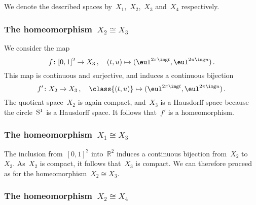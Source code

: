 \subsection{}

We denote the described spaces by~$X_1$,~$X_2$,~$X_3$ and~$X_4$ respectively.



\subsubsection*{The homeomorphism~$X_2 ≅ X_3$}

We consider the map
\[
	f
	\colon
	[0, 1]^2 \to X_3 \,,
	\quad
	(t, u) \mapsto (\eul^{2 \pi \img t}, \eul^{2 \pi \img u}) \,.
\]
This map is continuous and surjective, and induces a continuous bijection
\[
	f'
	\colon
	X_2 \to X_3 \,,
	\quad
	\class{(t, u)} \mapsto (\eul^{2 \pi \img t}, \eul^{2 \pi \img u}) \,.
\]
The quotient space~$X_2$ is again compact, and~$X_3$ is a Hausdorff space because the circle~$\mathrm{S}^1$ is a Hausdorff space.
It follows that~$f'$ is a homeomorphism.



\subsubsection*{The homeomorphism~$X_1 ≅ X_3$}

The inclusion from~$[0, 1]^2$ into~$ℝ^2$ induces a continuous bijection from~$X_2$ to~$X_3$.
As~$X_2$ is compact, it follows that~$X_3$ is compact.
We can therefore proceed as for the homeomorphism~$X_2 ≅ X_3$.



\subsubsection*{The homeomorphism~$X_2 ≅ X_4$}

